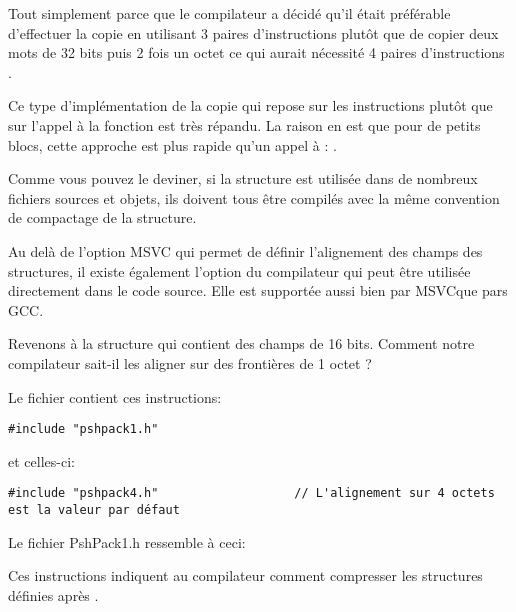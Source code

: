 Tout simplement parce que le compilateur a décidé qu'il était préférable d'effectuer la copie en utilisant 
3 paires d'instructions \MOV plutôt que de copier deux mots de 32 bits puis 2 fois un octet ce qui aurait 
nécessité 4 paires d'instructions \MOV.

Ce type d'implémentation de la copie qui repose sur les instructions \MOV plutôt que sur l'appel à la 
fonction  est très répandu. La raison en est que pour de petits blocs, cette approche est 
plus rapide qu'un appel à : .

Comme vous pouvez le deviner, si la structure est utilisée dans de nombreux fichiers sources et objets, ils 
doivent tous être compilés avec la même convention de compactage de la structure.

Au delà de l'option MSVC  qui permet de définir l'alignement des champs des structures, il existe 
également l'option du compilateur  qui peut être utilisée directement dans le code source.
Elle est supportée aussi bien par MSVC\FNURLMSDNZP que pars GCC\FNURLGCCPC{}.

Revenons à la structure  qui contient des champs de 16 bits. Comment notre compilateur sait-il 
les aligner sur des frontières de 1 octet ?

Le fichier  contient ces instructions:

\begin{lstlisting}[caption=WinNT.h,style=customc]
#include "pshpack1.h"
\end{lstlisting}

et celles-ci:

\begin{lstlisting}[caption=WinNT.h,style=customc]
#include "pshpack4.h"                   // L'alignement sur 4 octets est la valeur par défaut
\end{lstlisting}

Le fichier PshPack1.h ressemble à ceci:



Ces instructions indiquent au compilateur comment compresser les structures définies après .


